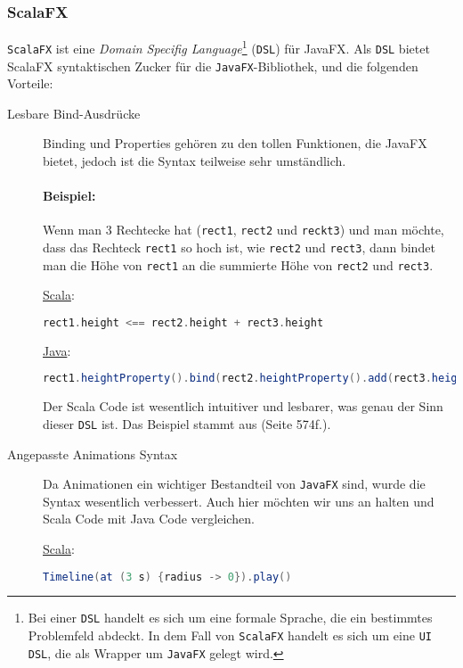 \subsubsection{ScalaFX}
\texttt{ScalaFX} ist eine \textit{Domain Specifig Language}\footnote{Bei einer \texttt{DSL} handelt es sich um eine formale Sprache, die ein bestimmtes Problemfeld abdeckt. In dem Fall von \texttt{ScalaFX} handelt es sich um eine \texttt{UI DSL}, die als Wrapper um \texttt{JavaFX} gelegt wird.} (\texttt{DSL}) für JavaFX. Als \texttt{DSL} bietet ScalaFX syntaktischen Zucker für die \texttt{JavaFX}-Bibliothek, und die folgenden Vorteile:

\begin{description}
\item[Lesbare Bind-Ausdrücke] Binding und Properties gehören zu den tollen Funktionen, die JavaFX bietet, jedoch ist die Syntax teilweise sehr umständlich.
\paragraph{Beispiel:} Wenn man 3 Rechtecke hat (\texttt{rect1}, \texttt{rect2} und \texttt{reckt3}) und man möchte, dass das Rechteck \texttt{rect1} so hoch ist, wie \texttt{rect2} und \texttt{rect3}, dann bindet man die Höhe von \texttt{rect1} an die summierte Höhe von \texttt{rect2} und \texttt{rect3}.

\underline{Scala}:
\begin{lstlisting}[language=scala,caption=Scala Beispiel Code für natürliche Bindings,numbers=none]
rect1.height <== rect2.height + rect3.height
\end{lstlisting}

\underline{Java}:
\begin{lstlisting}[language=Java,caption=Das selbe Beispiel in Java,numbers=none]
rect1.heightProperty().bind(rect2.heightProperty().add(rect3.heightProperty()))
\end{lstlisting}

Der Scala Code ist wesentlich intuitiver und lesbarer, was genau der Sinn dieser \texttt{DSL} ist. Das Beispiel stammt aus \cite{ProJavaFX8} (Seite 574f.).

\item[Angepasste Animations Syntax] Da Animationen ein wichtiger Bestandteil von \texttt{JavaFX} sind, wurde die Syntax wesentlich verbessert. Auch hier möchten wir uns an \cite{ProJavaFX8} halten und Scala Code mit Java Code vergleichen.

\underline{Scala}:
\begin{lstlisting}[language=scala,caption=Scala Beispiel für eine einface Animation,numbers=none]
Timeline(at (3 s) {radius -> 0}).play()
\end{lstlisting}


\end{description}

